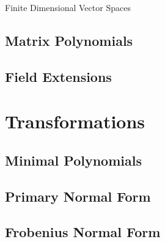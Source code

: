 \documentclass[article]{memoir}
\begin{document}
\begin{center}
\Huge Finite Dimensional Vector Spaces
\end{center}

\tableofcontents

\newpage 
\newpage 
\newpage 
\newpage 

\newpage 
\newpage  %
\newpage 
\newpage 
\newpage 
\newpage 
\newpage 
\newpage 
\newpage 
\newpage 
\newpage 

\newpage 
\newpage 

\newpage
\section{Matrix Polynomials}

\newpage
\section{Field Extensions}



\newpage
\chapter*{Transformations}

\newpage
\section{Minimal Polynomials}

\newpage
\section{Primary Normal Form}

\newpage
\section{Frobenius Normal Form}
\end{document}
